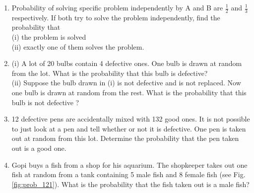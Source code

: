 \begin{enumerate}[label=\thesection.\arabic*.,ref=\thesection.\theenumi]
\item Probability of solving specific problem independently by A and B are $\frac{1}{2}$
and $\frac{1}{3}$ respectively. If both try to solve the problem independently, find the probability that\\
(i) the problem is solved \\
(ii) exactly one of them solves the problem.\\
\solution

\item (i) A lot of 20 bulbs contain 4 defective ones. One bulb is drawn at random from the lot.
What is the probability that this bulb is defective?\\
(ii) Suppose the bulb drawn in (i) is not defective and is not replaced. Now one bulb
is drawn at random from the rest. What is the probability that this bulb is not
defective ?
\\
\solution

\item 12 defective pens are accidentally mixed with 132 good ones. It is not possible to just
look at a pen and tell whether or not it is defective. One pen is taken out at random from
this lot. Determine the probability that the pen taken out is a good one.
\\
\solution

\item Gopi buys a fish from a shop for his aquarium. The
shopkeeper takes out one fish at random from a
tank containing 5 male fish and 8 female fish (see
Fig. \ref{fig:prob_121}). What is the probability that the fish taken
out is a male fish?
\begin{figure}[!ht]
\centering

\end{figure}
\end{enumerate}
